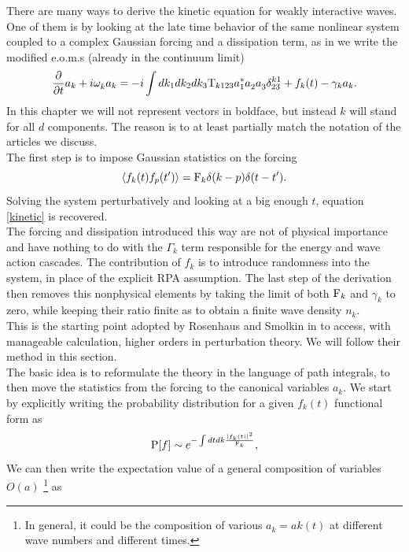 There are many ways to derive the kinetic equation for weakly interactive waves. One of them is by looking at the late time behavior of the same nonlinear system
coupled to a complex Gaussian forcing and a dissipation term, as in \cite{Zakharov1975} we write the modified e.o.m.s (already in the continuum limit)
\begin{equation}
    \frac{\partial}{\partial t} a_k + i \omega^{}_k a_k = -i \int dk_1 dk_2 dk_3 \mathrm{T}_{k123} a_1^*a_2^{}a_3^{} \delta^{k1}_{23} + f_k(t) - \gamma_k a_k.
    \label{eoms}
\end{equation}
In this chapter we will not represent vectors in boldface, but instead $k$ will stand for all $d$ components. The reason is to at least partially match the 
notation of the articles we discuss.\\ 
The first step is to impose Gaussian statistics on the forcing
\begin{equation}
    \langle f_k(t)f_p(t')\rangle = \mathrm{F}_k \delta(k-p)\delta(t-t').
\end{equation}
Solving the system perturbatively and looking at a big enough $t$, equation \eqref{kinetic} is recovered. \\
The forcing and dissipation introduced this way are not of physical importance and have nothing to do with the $\Gamma_k$ term responsible 
for the energy and wave action cascades. The contribution of $f_k$ is to introduce randomness into the system, in place of the explicit RPA assumption. 
The last step of the derivation then removes this nonphysical elements by taking the limit of both $\mathrm{F}_k$ and $\gamma_k$ to zero, while keeping their ratio finite as
to obtain a finite wave density $n_k$. \\  
This is the starting point adopted by Rosenhaus and Smolkin in \cite{Rosenhaus2023} to access, with manageable calculation, higher orders in perturbation theory. We will 
follow their method in this section.\\
The basic idea is to reformulate the theory in the language of path integrals, to then move the statistics from the forcing to the canonical variables $a_k^{}$. We start by
explicitly writing the probability distribution for a given $f_k(t)$ functional form as 
\begin{equation}  
    \mathrm{P}[f] \sim e^{-\int dt dk \frac{|f_k(t)|^2}{\mathrm{F}_k}},
\end{equation}
We can then write the expectation value of a general composition of variables $O(a)$ \footnote{
    In general, it could be the composition of various $a_k^{} = ak(t)$ at different wave numbers and different times.
} as 

